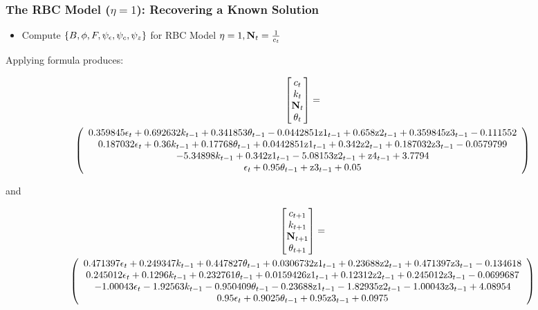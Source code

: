 \documentclass[letter]{beamer}
\begin{document}
\begin{frame}
  \frametitle{The RBC Model ($\eta=1$): Recovering a Known Solution}
  \begin{itemize}
  \item Compute ${\{B,\phi,F,\psi_\epsilon,\psi_c,\psi_z\}}$ for RBC Model $\eta=1,{\mathbf{N}}_t=\frac{1}{c_t}$
  \end{itemize}

Applying formula  produces:

{\tiny
\begin{gather}
  \begin{bmatrix}
c_t\\k_t\\ \rcpC_t\\\theta_t
  \end{bmatrix}=\\%
   \left(
   \begin{array}{c}
 0.359845 \epsilon _t+0.692632 k_{t-1}+0.341853 \theta _{t-1}-0.0442851
   \text{z1}_{t-1}+0.658 \text{z2}_{t-1}+0.359845 \text{z3}_{t-1}-0.111552 \\
 0.187032 \epsilon _t+0.36 k_{t-1}+0.17768 \theta _{t-1}+0.0442851
   \text{z1}_{t-1}+0.342 \text{z2}_{t-1}+0.187032 \text{z3}_{t-1}-0.0579799 \\
 -5.34898 k_{t-1}+0.342 \text{z1}_{t-1}-5.08153
   \text{z2}_{t-1}+\text{z4}_{t-1}+3.7794 \\
 \epsilon _t+0.95 \theta _{t-1}+\text{z3}_{t-1}+0.05 \\
   \end{array}
   \right)
\end{gather}
}

and 


{\tiny
\begin{gather}
  \begin{bmatrix}
c_{t+1}\\k_{t+1}\\ \rcpC_{t+1}\\\theta_{t+1}
  \end{bmatrix}=\\%
  \left(
   \begin{array}{c}
 0.471397 \epsilon _t+0.249347 k_{t-1}+0.447827 \theta _{t-1}+0.0306732
   \text{z1}_{t-1}+0.23688 \text{z2}_{t-1}+0.471397 \text{z3}_{t-1}-0.134618 \\
 0.245012 \epsilon_t+0.1296 k_{t-1}+0.232761 \theta _{t-1}+0.0159426
   \text{z1}_{t-1}+0.12312 \text{z2}_{t-1}+0.245012 \text{z3}_{t-1}-0.0699687 \\
 -1.00043 \epsilon _t-1.92563 k_{t-1}-0.950409 \theta _{t-1}-0.23688
   \text{z1}_{t-1}-1.82935 \text{z2}_{t-1}-1.00043 \text{z3}_{t-1}+4.08954 \\
 0.95 \epsilon _t+0.9025 \theta _{t-1}+0.95 \text{z3}_{t-1}+0.0975 \\
   \end{array}
   \right)
\end{gather}}


\end{frame}
\end{document}
